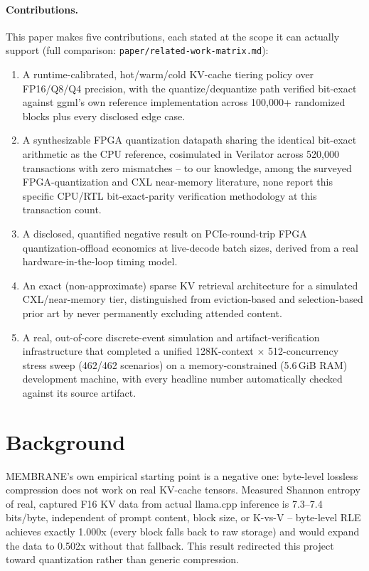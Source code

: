 \documentclass[11pt]{article}
\begin{document}
\paragraph{Contributions.} This paper makes five contributions, each
stated at the scope it can actually support (full comparison:
\texttt{paper/related-work-matrix.md}):
\begin{enumerate}
\item A runtime-calibrated, hot/warm/cold KV-cache tiering policy over
  FP16/Q8/Q4 precision, with the quantize/dequantize path verified
  bit-exact against ggml's own reference implementation across
  100{,}000+ randomized blocks plus every disclosed edge case.
\item A synthesizable FPGA quantization datapath sharing the identical
  bit-exact arithmetic as the CPU reference, cosimulated in Verilator
  across 520{,}000 transactions with zero mismatches -- to our
  knowledge, among the surveyed FPGA-quantization and CXL near-memory
  literature, none report this specific CPU/RTL bit-exact-parity
  verification methodology at this transaction count.
\item A disclosed, quantified negative result on PCIe-round-trip FPGA
  quantization-offload economics at live-decode batch sizes, derived
  from a real hardware-in-the-loop timing model.
\item An exact (non-approximate) sparse KV retrieval architecture for a
  simulated CXL/near-memory tier, distinguished from eviction-based
  \cite{zhang2023h2o,liu2023scissorhands,xiao2024streamingllm} and
  selection-based \cite{tang2024quest,kim2025pnmcxl} prior art by never
  permanently excluding attended content.
\item A real, out-of-core discrete-event simulation and
  artifact-verification infrastructure that completed a unified
  128K-context $\times$ 512-concurrency stress sweep (462/462
  scenarios) on a memory-constrained (5.6\,GiB RAM) development
  machine, with every headline number automatically checked against its
  source artifact.
\end{enumerate}

\section{Background}

MEMBRANE's own empirical starting point is a negative one: byte-level
lossless compression does not work on real KV-cache tensors. Measured
Shannon entropy of real, captured F16 KV data from actual llama.cpp
inference is 7.3--7.4 bits/byte, independent of prompt content, block
size, or K-vs-V -- byte-level RLE achieves exactly 1.000x (every block
falls back to raw storage) and would expand the data to 0.502x without
that fallback. This result redirected this project toward quantization
rather than generic compression.
\end{document}
